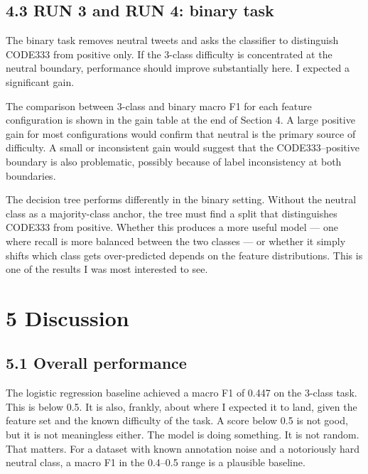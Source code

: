 \documentclass[12pt]{article}
\begin{document}
\subsection*{4.3 RUN 3 and RUN 4: binary task}



The binary task removes neutral tweets and asks the classifier to distinguish CODE333 from positive only. If the 3-class difficulty is concentrated at the neutral boundary, performance should improve substantially here. I expected a significant gain.



The comparison between 3-class and binary macro F1 for each feature configuration is shown in the gain table at the end of Section 4. A large positive gain for most configurations would confirm that neutral is the primary source of difficulty. A small or inconsistent gain would suggest that the CODE333--positive boundary is also problematic, possibly because of label inconsistency at both boundaries.



The decision tree performs differently in the binary setting. Without the neutral class as a majority-class anchor, the tree must find a split that distinguishes CODE333 from positive. Whether this produces a more useful model --- one where recall is more balanced between the two classes --- or whether it simply shifts which class gets over-predicted depends on the feature distributions. This is one of the results I was most interested to see.



\section*{5 Discussion}



\subsection*{5.1 Overall performance}



The logistic regression baseline achieved a macro F1 of 0.447 on the 3-class task. This is below 0.5. It is also, frankly, about where I expected it to land, given the feature set and the known difficulty of the task. A score below 0.5 is not good, but it is not meaningless either. The model is doing something. It is not random. That matters. For a dataset with known annotation noise and a notoriously hard neutral class, a macro F1 in the 0.4--0.5 range is a plausible baseline.
\end{document}
